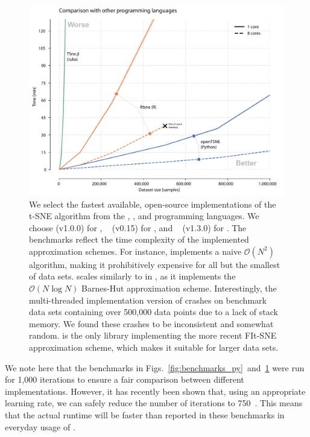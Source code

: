 \documentclass[article]{jss}
\newcommand{\opentsne}{\pkg{openTSNE}\xspace}
\begin{document}
\begin{figure}[ht]
  \centering
  \includegraphics{benchmarks_langs-final}
  \caption{\label{fig:benchmarks_lang}
  We select the fastest available, open-source implementations of the t-SNE algorithm from the , , and  programming languages. We choose \opentsne (v1.0.0) for , ~\citep{krijthe2015rtsne} (v0.15) for , and ~\citep{julia_tsne} (v1.3.0) for . The benchmarks reflect the time complexity of the implemented approximation schemes. For instance,  implements a naive $\mathcal{O}(N^2)$ algorithm, making it prohibitively expensive for all but the smallest of data sets.  scales similarly to  in , as it implements the $\mathcal{O}(N \log N)$ Barnes-Hut approximation scheme. Interestingly, the multi-threaded implementation version of  crashes on benchmark data sets containing over 500,000 data points due to a lack of stack memory. We found these crashes to be inconsistent and somewhat random. \opentsne is the only library implementing the more recent FIt-SNE approximation scheme, which makes it suitable for larger data sets. }
\end{figure}

We note here that the benchmarks in Figs.~\ref{fig:benchmarks_py}~and~\ref{fig:benchmarks_lang} were run for 1,000 iterations to ensure a fair comparison between different implementations. However, it has recently been shown that, using an appropriate learning rate, we can safely reduce the number of iterations to 750~\citep{belkina2019automated}. This means that the actual runtime will be faster than reported in these benchmarks in everyday usage of \opentsne.
\end{document}
